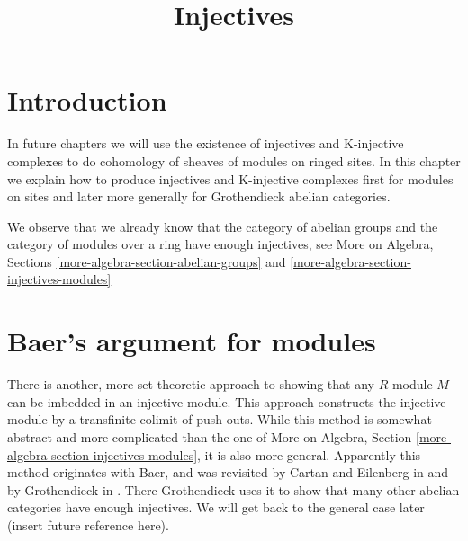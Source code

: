 

%


\title{Injectives}


\maketitle

\label{section-phantom}

\tableofcontents

\section{Introduction}
\label{section-introduction}

\noindent
In future chapters we will use the existence of injectives and
K-injective complexes to do cohomology of sheaves of modules on
ringed sites. In this chapter we explain how to produce injectives
and K-injective complexes first for modules on sites and later
more generally for Grothendieck abelian categories.

\medskip\noindent
We observe that we already know that the category of
abelian groups and the category of modules over a ring have
enough injectives, see More on Algebra, Sections
\ref{more-algebra-section-abelian-groups} and
\ref{more-algebra-section-injectives-modules}





\section{Baer's argument for modules}
\label{section-baer}

\noindent
There is another, more set-theoretic approach to showing that any $R$-module
$M$ can be imbedded in an injective module. This approach constructs
the injective module by a transfinite colimit of push-outs. While this
method is somewhat abstract and more complicated than the one of
More on Algebra, Section \ref{more-algebra-section-injectives-modules},
it is also more general. Apparently this method originates with Baer,
and was revisited by Cartan and Eilenberg in
\cite{Cartan-Eilenberg} and by Grothendieck in \cite{Tohoku}.
There Grothendieck uses it to show that
many other abelian categories have enough injectives. We will get back to
the general case later (insert future reference here).

